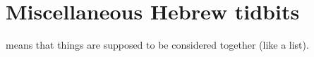 \section{Miscellaneous Hebrew tidbits}\label{app:misc-heb}\thispagestyle{fancy}
 means that things are supposed to be considered together (like a list).
